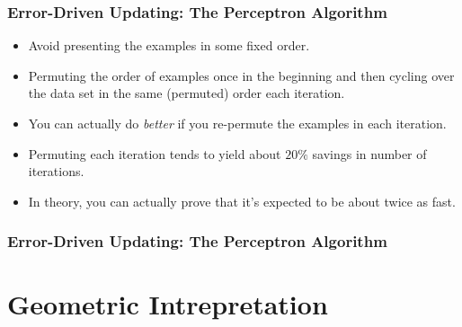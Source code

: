 \documentclass[trans]{beamer}
\begin{document}
\begin{frame}
  \frametitle{Error-Driven Updating: The Perceptron Algorithm}
\begin{itemize}
\item
Avoid presenting the examples in some
fixed order. 
\item Permuting the order
of examples once in the beginning and then cycling over the data set
in the same (permuted) order each iteration. 
\item You can actually do \emph{better} if you re-permute the examples
in each iteration.  
\item Permuting each
iteration tends to yield about $20\%$ savings in number of iterations.
\item In theory, you can actually prove that it's expected to be about twice
as fast.
\end{itemize}
\end{frame}

\begin{frame}
  \frametitle{Error-Driven Updating: The Perceptron Algorithm}
\end{frame}
\section{Geometric Intrepretation}
\end{document}
